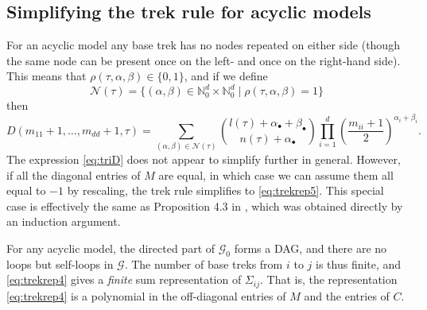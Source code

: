 \documentclass[10pt,twoside,a4paper]{amsart}
\begin{document}
\subsection{Simplifying the trek rule for acyclic models}
For an acyclic model any base trek has no nodes repeated on either side 
(though the 
same node can be present once on the left- and once on the right-hand side).
This means that $\rho(\tau, \alpha, \beta) \in \{0, 1\}$, and if we 
define 
$$\mathcal{N}(\tau) = \{ (\alpha, \beta) \in \mathbb{N}_0^d \times \mathbb{N}_0^d 
\mid \rho(\tau, \alpha, \beta) = 1\}$$
then 
\begin{equation} \label{eq:triD}
    D(m_{11} + 1, \ldots, m_{dd} + 1, \tau) = \sum_{(\alpha, \beta) \in \mathcal{N}(\tau)}
    {l(\tau) + \alpha_{\bullet} + \beta_{\bullet} \choose n(\tau) + \alpha_{\bullet}} 
    \prod_{i=1}^d \left(\frac{m_{ii} + 1}{2}\right)^{\alpha_i + \beta_i}.
\end{equation}
The expression \eqref{eq:triD} does not appear to simplify further in general.
However, if all the diagonal entries of $M$ are equal, in which case we can
assume them all equal to $-1$ by rescaling, the trek rule simplifies to
\eqref{eq:trekrep5}. This special case is effectively the same as Proposition 
 4.3 in \cite{boege2024}, which was obtained directly by an induction argument.

For any acyclic model, the directed part of $\mathcal{G}_0$ forms a DAG, and
there are no loops but self-loops in $\mathcal{G}$. The number of base treks
from $i$ to $j$ is thus finite, and \eqref{eq:trekrep4} gives a
\emph{finite} sum representation of $\Sigma_{ij}$. That is, the representation
\eqref{eq:trekrep4} is a polynomial in the off-diagonal entries of $M$ and the
entries of $C$.
\end{document}
